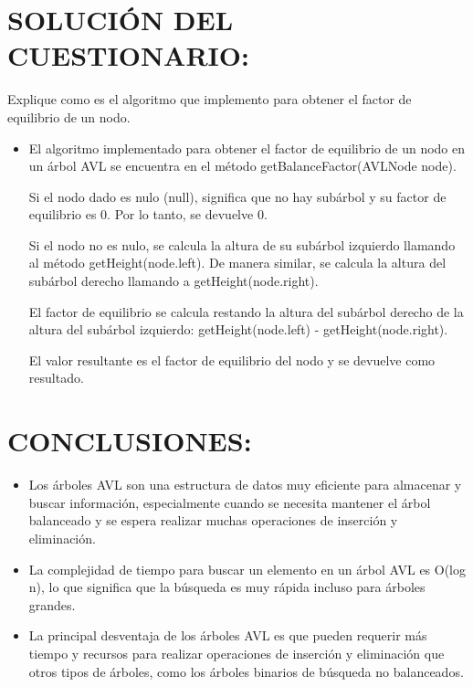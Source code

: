 \documentclass{article}
\begin{document}
        \section{SOLUCIÓN DEL CUESTIONARIO:}
            Explique como es el algoritmo que implemento para obtener el factor de equilibrio de un nodo.
            \begin{itemize}
                \item El algoritmo implementado para obtener el factor de equilibrio de un nodo en un árbol AVL se encuentra en el método getBalanceFactor(AVLNode node).

                Si el nodo dado es nulo (null), significa que no hay subárbol y su factor de equilibrio es 0. Por lo tanto, se devuelve 0.
                
                Si el nodo no es nulo, se calcula la altura de su subárbol izquierdo llamando al método getHeight(node.left). De manera similar, se calcula la altura del subárbol derecho llamando a getHeight(node.right).
                
                El factor de equilibrio se calcula restando la altura del subárbol derecho de la altura del subárbol izquierdo: getHeight(node.left) - getHeight(node.right).
                
                El valor resultante es el factor de equilibrio del nodo y se devuelve como resultado.
            \end{itemize}
        \clearpage
        \section{CONCLUSIONES:}
            \begin{itemize}
                \item Los árboles AVL son una estructura de datos muy eficiente para almacenar y buscar información, especialmente cuando se necesita mantener el árbol balanceado y se espera realizar muchas operaciones de inserción y eliminación.
                \item La complejidad de tiempo para buscar un elemento en un árbol AVL es O(log n), lo que significa que la búsqueda es muy rápida incluso para árboles grandes.
                \item La principal desventaja de los árboles AVL es que pueden requerir más tiempo y recursos para realizar operaciones de inserción y eliminación que otros tipos de árboles, como los árboles binarios de búsqueda no balanceados.
            \end{itemize}
        \clearpage
\end{document}
